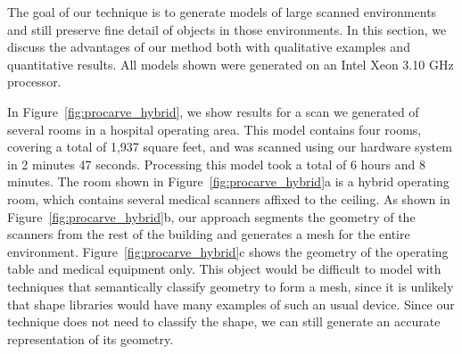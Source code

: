 \documentclass[12pt,onecolumn,oneside]{book}
\begin{document}
The goal of our technique is to generate models of large scanned environments and still preserve fine detail of objects in those environments.  In this section, we discuss the advantages of our method both with qualitative examples and quantitative results.  All models shown were generated on an Intel Xeon 3.10 GHz processor.

In Figure~\ref{fig:procarve_hybrid}, we show results for a scan we generated of several rooms in a hospital operating area.  This model contains four rooms, covering a total of 1,937 square feet, and was scanned using our hardware system in 2 minutes 47 seconds.  Processing this model took a total of 6 hours and 8 minutes.  The room shown in Figure~\ref{fig:procarve_hybrid}a is a hybrid operating room, which contains several medical scanners affixed to the ceiling.  As shown in Figure~\ref{fig:procarve_hybrid}b, our approach segments the geometry of the scanners from the rest of the building and generates a mesh for the entire environment.  Figure~\ref{fig:procarve_hybrid}c shows the geometry of the operating table and medical equipment only.  This object would be difficult to model with techniques that semantically classify geometry to form a mesh, since it is unlikely that shape libraries would have many examples of such an usual device.  Since our technique does not need to classify the shape, we can still generate an accurate representation of its geometry.
\end{document}
